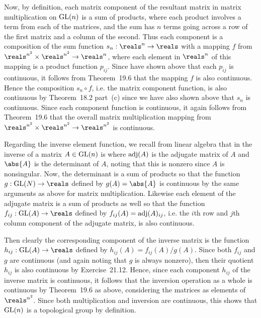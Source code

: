 {{    Now, by definition, each matrix component of the resultant matrix in matrix multiplication on $\mathrm{GL}(n)$ is a sum of products, where each product involves a term from each of the matrices, and the sum has $n$ terms going across a row of the first matrix and a column of the second.
    Thus each component is a composition of the sum function $s_n : \reals^n \to \reals$ with a mapping $f$ from $\reals^{n^2} \times \reals^{n^2} \to \reals^n$, where each element in $\reals^n$ of this mapping is a product function $p_{ij}$.
    Since have shown above that each $p_{ij}$ is continuous, it follows from Theorem~19.6 that the mapping $f$ is also continuous.
    Hence the composition $s_n \circ f$, i.e. the matrix component function, is also continuous by Theorem~18.2 part~(c) since we have also shown above that $s_n$ is continuous.
    Since each component function is continuous, it again follows from Theorem~19.6 that the overall matrix multiplication mapping from $\reals^{n^2} \times \reals^{n^2} \to \reals^{n^2}$ is continuous.

    Regarding the inverse element function, we recall from linear algebra that in the inverse of a matrix $A \in \mathrm{GL}(n)$ is
    where $\mathrm{adj}(A)$ is the adjugate matrix of $A$ and $\abs{A}$ is the determinant of $A$, noting that this is nonzero since $A$ is nonsingular.
    Now, the determinant is a sum of products so that the function $g: \gl(N) \to \reals$ defined by $g(A) = \abs{A}$ is continuous by the same arguments as above for matrix multiplication.
    Likewise each element of the adjugate matrix is a sum of products as well so that the function $f_{ij} : \gl(A) \to \reals$ defined by $f_{ij}(A) = \mathrm{adj}(A)_{ij}$, i.e. the $i$th row and $j$th column component of the adjugate matrix, is also continuous.

    Then clearly the corresponding component of the inverse matrix is the function $h_{ij} : \gl(A) \to \reals$ defined by $h_{ij}(A) = f_{ij}(A)/g(A)$.
    Since both $f_{ij}$ and $g$ are continuous (and again noting that $g$ is always nonzero), then their quotient $h_{ij}$ is also continuous by Exercise~21.12.
    Hence, since each component $h_{ij}$ of the inverse matrix is continuous, it follows that the inversion operation as a whole is continuous by Theorem~19.6 as above, considering the matrices as elements of $\reals^{n^2}$.
    Since both multiplication and inversion are continuous, this shows that $\mathrm{GL}(n)$ is a topological group by definition.
  }
}

\renewcommand\thesubsection{\arabic{subsection}}
